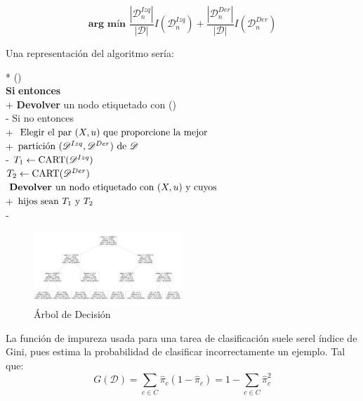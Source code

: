 \documentclass[conference,a4paper]{IEEEtran}
\begin{document}
\begin{equation}
\textbf{arg mín  } \frac{|\mathscr{D}_{n}^{Izq}|}{|\mathscr{D}|}I(\mathscr{D}_{n}^{Izq})+ \frac{|\mathscr{D}_{n}^{Der}|}{|\mathscr{D}|}I(\mathscr{D}_{n}^{Der})
\end{equation}

Una representación del algoritmo sería:

\begin{pseudo}*
    () \\
    \textbf{Si} \textnormal{} \textbf{entonces} \\+
    \textbf{Devolver} \textnormal{un nodo etiquetado con ()} \\-
    Si no entonces \\+
    \(\textnormal{Elegir el par $(X, u)$ que proporcione la mejor} \) \\+
    \(\textnormal{partición $(\mathscr{D}^{Izq},\mathscr{D}^{Der})$ de $\mathscr{D}$}\) \\-
    \( T_{1} \leftarrow \textnormal{CART($\mathscr{D}^{Izq}$)}\) \\
    \( T_{2} \leftarrow \textnormal{CART($\mathscr{D}^{Der}$)}\) \\
    \(\textbf{Devolver } \textnormal{un nodo etiquetado con ($X, u$) y cuyos}\)\\+
    \(\textnormal{hijos sean $T_{1}$  y $T_{2}$}\)\\-
 \end{pseudo}



\begin{figure} %
    \centering
    \includegraphics[width=0.5\textwidth]{./ImagenesMemoria/Arbol}
    \caption{\label{fig:arbolDecision}Árbol de Decisión}
\end{figure}

 La función de impureza usada para una tarea de clasificación suele serel índice de Gini, pues estima la probabilidad de clasificar incorrectamente un ejemplo. Tal que: 
\begin{equation}
G(\mathscr{D}) = \sum_{c\in C} \hat{\pi}_c (1-  \hat{\pi}_c) = 1 -  \sum_{c\in C}  \hat{\pi}_c^2
\end{equation}
\end{document}
